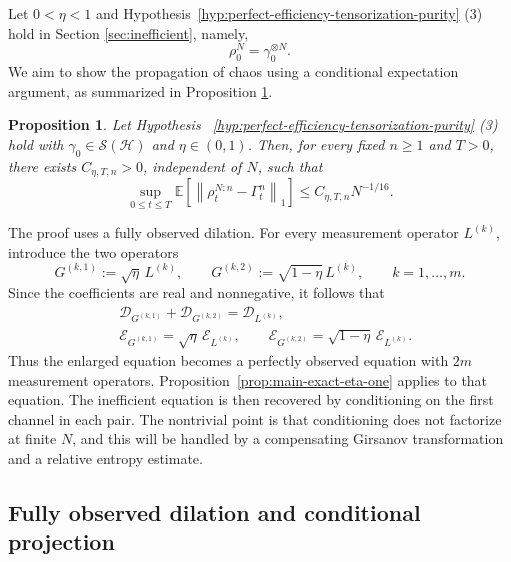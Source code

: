 \documentclass[10pt,a4paper,reqno]{amsart}
\numberwithin{equation}{section}
\theoremstyle{plain}
\newtheorem{proposition}[theorem]{Proposition}
\theoremstyle{definition}
\theoremstyle{remark}
\newcommand{\E}{\mathbb E}
\newcommand{\cS}{\mathcal S}
\newcommand{\cD}{\mathcal D}
\newcommand{\cE}{\mathcal E}
\newcommand{\HH}{\mathcal H}
\newcommand{\1}{\mathbf 1}
\begin{document}
Let  $0<\eta<1$ and Hypothesis~\ref{hyp:perfect-efficiency-tensorization-purity} (3) hold in Section \ref{sec:inefficient},  namely, 
$$\rho^N_0=\gamma_0^{\otimes N}.$$
We aim to show the propagation of chaos using a conditional expectation argument,  as summarized in Proposition \ref{prop:main-exact-eta-less-one}. 


\begin{proposition}
\label{prop:main-exact-eta-less-one}
Let Hypothesis ~\ref{hyp:perfect-efficiency-tensorization-purity} (3) hold with
$\gamma_0\in\cS(\HH)$ and $\eta\in (0,1)$.    
Then, for every fixed $n\ge1$ and $T>0$, there exists 
$C_{\eta, T,n}>0$, independent of $N$, such that
\begin{equation}
  \sup_{0\le t\le T}
  \E\left[
    \left\|
      \rho_t^{N:n}-\Gamma_t^n
    \right\|_1
  \right]
  \le C_{\eta,T,n}N^{-1/16}.
  \label{eq:eta-main-rate}
\end{equation}
\end{proposition}

The proof uses a fully observed dilation.  For every  measurement
operator \(L^{(k)}\), introduce the two operators
\begin{equation}
  G^{(k,1)}:=\sqrt{\eta}\,L^{(k)},
  \qquad
  G^{(k,2)}:=\sqrt{1-\eta}\,L^{(k)},
  \qquad
  k=1,\ldots,  m.
  \label{eq:eta-dilated-operators}
\end{equation}
Since the coefficients are real and nonnegative, it follows that
\begin{align}
  &\cD_{G^{(k,1)}}+\cD_{G^{(k,2)}}
  =\cD_{L^{(k)}},
  \label{eq:eta-dilated-D}
  \\
  &\cE_{G^{(k,1)}}
  =\sqrt{\eta}\,\cE_{L^{(k)}},
  \qquad
  \cE_{G^{(k,2)}}
  =\sqrt{1-\eta}\,\cE_{L^{(k)}}.
  \label{eq:eta-dilated-E}
\end{align}
Thus the enlarged equation becomes a perfectly observed equation with \(2m\)
measurement operators.  Proposition~\ref{prop:main-exact-eta-one} applies to that equation.
The inefficient equation is then recovered by conditioning on the first
channel in each pair.  The nontrivial point is that conditioning does not
factorize at finite \(N\),  and this will be handled by a compensating Girsanov
transformation and a relative entropy estimate.




\subsection{Fully observed dilation and conditional projection}
\label{subsec:eta-dilation-projection}
\end{document}
